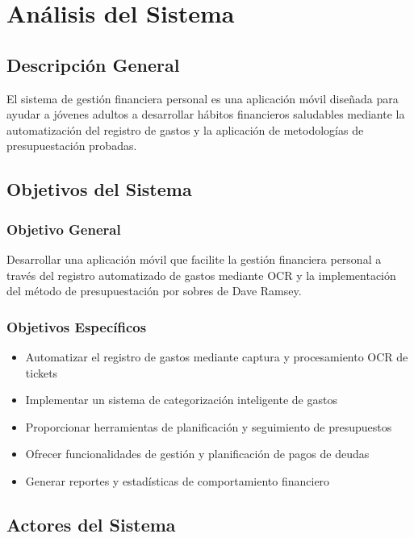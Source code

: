 \chapter{Análisis del Sistema}

\section{Descripción General}

El sistema de gestión financiera personal es una aplicación móvil diseñada para ayudar a jóvenes adultos a desarrollar hábitos financieros saludables mediante la automatización del registro de gastos y la aplicación de metodologías de presupuestación probadas.

\section{Objetivos del Sistema}

\subsection{Objetivo General}
Desarrollar una aplicación móvil que facilite la gestión financiera personal a través del registro automatizado de gastos mediante OCR y la implementación del método de presupuestación por sobres de Dave Ramsey.

\subsection{Objetivos Específicos}
\begin{itemize}
    \item Automatizar el registro de gastos mediante captura y procesamiento OCR de tickets
    \item Implementar un sistema de categorización inteligente de gastos
    \item Proporcionar herramientas de planificación y seguimiento de presupuestos
    \item Ofrecer funcionalidades de gestión y planificación de pagos de deudas
    \item Generar reportes y estadísticas de comportamiento financiero
\end{itemize}

\section{Actores del Sistema}

